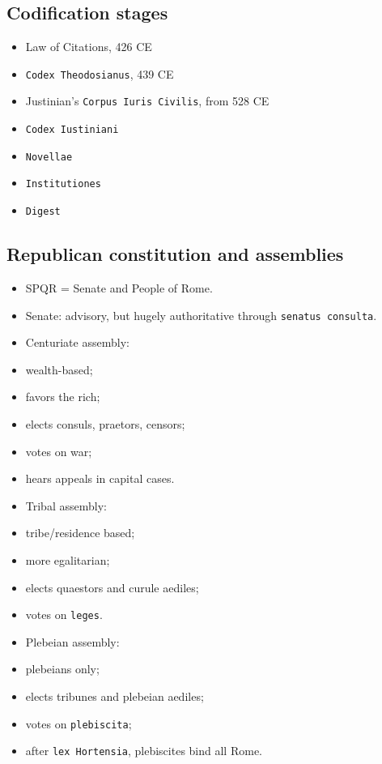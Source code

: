 \documentclass[11pt]{article}
\begin{document}
\subsection{Codification stages}

\begin{itemize}
\item Law of Citations, 426 CE
\item \texttt{Codex Theodosianus}, 439 CE
\item Justinian's \texttt{Corpus Iuris Civilis}, from 528 CE
\item \texttt{Codex Iustiniani}
\item \texttt{Novellae}
\item \texttt{Institutiones}
\item \texttt{Digest}
\end{itemize}

\subsection{Republican constitution and assemblies}

\begin{itemize}
\item SPQR = Senate and People of Rome.
\item Senate: advisory, but hugely authoritative through \texttt{senatus consulta}.
\item Centuriate assembly:
\item wealth-based;
\item favors the rich;
\item elects consuls, praetors, censors;
\item votes on war;
\item hears appeals in capital cases.
\item Tribal assembly:
\item tribe/residence based;
\item more egalitarian;
\item elects quaestors and curule aediles;
\item votes on \texttt{leges}.
\item Plebeian assembly:
\item plebeians only;
\item elects tribunes and plebeian aediles;
\item votes on \texttt{plebiscita};
\item after \texttt{lex Hortensia}, plebiscites bind all Rome.
\end{itemize}
\end{document}
